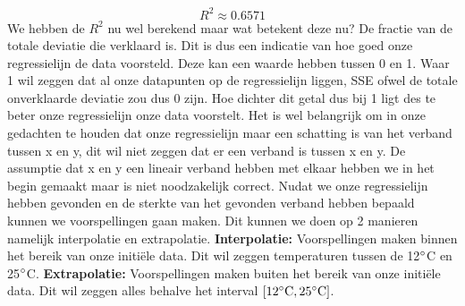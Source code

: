 \documentclass[11pt]{report}
\newcommand{\pbr}{\hfill\break\hfill\break}
\newcommand{\lbr}{\hfill\break}
\begin{document}
\begin{equation*}
  R^2 \approx 0.6571
\end{equation*}
We hebben de $R^2$ nu wel berekend maar wat betekent deze nu? De fractie van de totale deviatie die verklaard is. Dit is dus een indicatie van hoe goed onze regressielijn de data voorsteld. Deze kan een waarde hebben tussen 0 en 1. Waar 1 wil zeggen dat al onze datapunten op de regressielijn liggen, SSE ofwel de totale onverklaarde deviatie zou dus 0 zijn. Hoe dichter dit getal dus bij 1 ligt des te beter onze regressielijn onze data voorstelt. Het is wel belangrijk om in onze gedachten te houden dat onze regressielijn maar een schatting is van het verband tussen x en y, dit wil niet zeggen dat er een verband is tussen x en y. De assumptie dat x en y een lineair verband hebben met elkaar hebben we in het begin gemaakt maar is niet noodzakelijk correct.
\pbr
Nudat we onze regressielijn hebben gevonden en de sterkte van het gevonden verband hebben bepaald kunnen we voorspellingen gaan maken. Dit kunnen we doen op 2 manieren namelijk interpolatie en extrapolatie.
\pbr
\textbf{Interpolatie:}\lbr
Voorspellingen maken binnen het bereik van onze initiële data. Dit wil zeggen temperaturen tussen de 12$\degree$C en 25$\degree$C.
\pbr
\textbf{Extrapolatie:}\lbr
Voorspellingen maken buiten het bereik van onze initiële data. Dit wil zeggen alles behalve het interval $[12\degree\text{C}, 25\degree\text{C}]$.

\printbibliography
\end{document}
